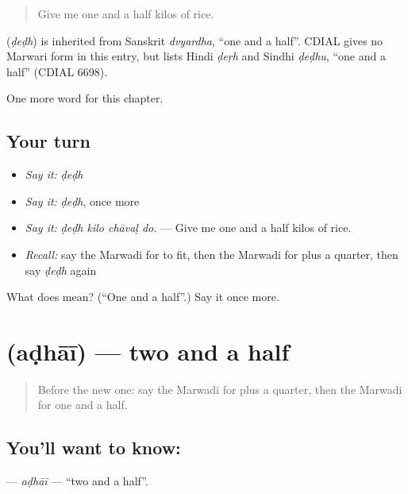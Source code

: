 \begin{quote}
Give me one and a half kilos of rice.
\end{quote}

\begin{cousinweb}
\textbf{} (\emph{ḍeḍh}) is inherited from Sanskrit \emph{dvyardha}, \textquotedblleft{}one and a half\textquotedblright{}. CDIAL gives no Marwari form in this entry, but lists Hindi \emph{ḍeṛh} and Sindhi \emph{ḍeḍhu}, \textquotedblleft{}one and a half\textquotedblright{} (CDIAL 6698).
\end{cousinweb}

\begin{grammarlens}[title={What you've built}]
One more word for this chapter.
\end{grammarlens}

\subsection*{Your turn}
\begin{itemize}
\raggedright
  \item \emph{Say it:} \emph{ḍeḍh}
  \item \emph{Say it:} \emph{ḍeḍh}, once more
  \item \emph{Say it:} \emph{ḍeḍh kilo chāvaḷ do.} — Give me one and a half kilos of rice.
  \item \emph{Recall:} say the Marwadi for to fit, then the Marwadi for plus a quarter, then say \emph{ḍeḍh} again
\end{itemize}

\begin{tcolorbox}[breakable,colback=teal!4,colframe=teal!35!black,title={Before you move on}]
What does  mean? (\textquotedblleft{}One and a half\textquotedblright{}.) Say it once more.
\end{tcolorbox}
\section[\texorpdfstring{\mw{अढाई} (aḍhāī)}{अढाई (aḍhāī)}]{ (aḍhāī) — two and a half}

\label{lesson:MW-C212-adhai}



\begin{quote}
Before the new one: say the Marwadi for plus a quarter, then the Marwadi for one and a half.
\end{quote}

\subsection*{You'll want to know: }
\textbf{} — \emph{aḍhāī} — \textquotedblleft{}two and a half\textquotedblright{}.

